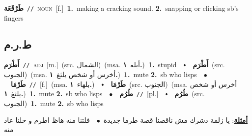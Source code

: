 \documentclass[10pt,a4paper,twoside]{article} %
\begin{document}
\begin{multicols}{2}
{\setlength\topsep{0pt}\textbf{\foreignlanguage{arabic}{طَرْقَعَة}}\ {\color{gray}\texttt{//}\color{black}}\ \textsc{noun}\ [f.]\ \textbf{1.}~making a cracking sound.  \textbf{2.}~snapping or clicking sb's fingers\ } \vspace{2mm}

\vspace{-3mm}
\subsection*{\color{blue}\foreignlanguage{arabic}{ط.ر.م}\color{blue}{}} 

{\setlength\topsep{0pt}\textbf{\foreignlanguage{arabic}{أَطْرَم}}\ {\color{gray}\texttt{//}\color{black}}\ \textsc{adj}\ [m.]\ (src. \color{gray}\foreignlanguage{arabic}{الشمال}\color{black})\ \color{gray}(msa. \foreignlanguage{arabic}{أبله}~\foreignlanguage{arabic}{\textbf{١.}})\color{black}\ \textbf{1.}~stupid\ \ $\smblkdiamond$\ \ \setlength\topsep{0pt}\textbf{\foreignlanguage{arabic}{أَطْرَم}}\ (src. \color{gray}\foreignlanguage{arabic}{الجنوب}\color{black})\ \color{gray}(msa. \foreignlanguage{arabic}{أخرس أو شخص يلثغ}~\foreignlanguage{arabic}{\textbf{١.}})\color{black}\ \textbf{1.}~mute  \textbf{2.}~sb who lisps\ \ $\bullet$\ \ \setlength\topsep{0pt}\textbf{\foreignlanguage{arabic}{طَرْمَا}}\ {\color{gray}\texttt{//}\color{black}}\ [f.]\ \color{gray}(msa. \foreignlanguage{arabic}{بلهاء}~\foreignlanguage{arabic}{\textbf{١.}})\color{black}\ \ $\smblkdiamond$\ \ \setlength\topsep{0pt}\textbf{\foreignlanguage{arabic}{طَرْمَا}}\ (src. \color{gray}\foreignlanguage{arabic}{الجنوب}\color{black})\ \color{gray}(msa. \foreignlanguage{arabic}{أخرس أو شخص يلثغ}~\foreignlanguage{arabic}{\textbf{١.}})\color{black}\ \textbf{1.}~mute  \textbf{2.}~sb who lisps\ \ $\bullet$\ \ \setlength\topsep{0pt}\textbf{\foreignlanguage{arabic}{طُرُم}}\ {\color{gray}\texttt{//}\color{black}}\ [pl.]\ \ $\smblkdiamond$\ \ \setlength\topsep{0pt}\textbf{\foreignlanguage{arabic}{طُرُم}}\ (src. \color{gray}\foreignlanguage{arabic}{الجنوب}\color{black})\ \textbf{1.}~mute  \textbf{2.}~sb who lisps\  \begin{flushright}\color{gray}\foreignlanguage{arabic}{\textbf{\underline{\foreignlanguage{arabic}{أمثلة}}}: يا زلمة دشرك مش ناقصنا قصة طرما جديدة\ $\bullet$\ \  فلتنا منه هاظ اطرم و حلنا عاد منه}\end{flushright}\color{black}} \vspace{2mm}


\end{multicols}
\end{document}
